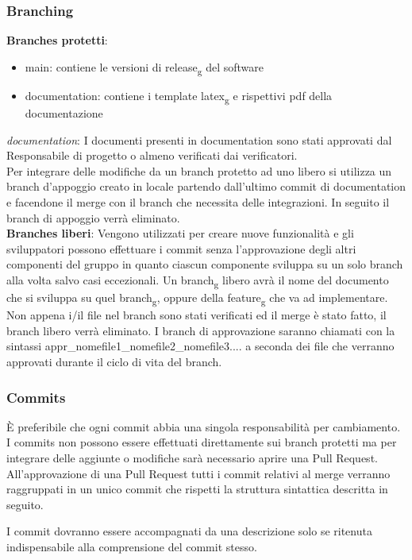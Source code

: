 \subsubsection{Branching}
\textbf{Branches protetti}:
    \begin{itemize} 
        \item main: contiene le versioni di release\textsubscript{g} del software
        \item documentation: contiene i template latex\textsubscript{g} e rispettivi pdf della documentazione
    \end{itemize}
\textit{documentation}: 
I documenti presenti in documentation sono stati approvati dal Responsabile di progetto o almeno verificati dai verificatori.\\
Per integrare delle modifiche da un branch protetto ad uno libero si utilizza un branch d’appoggio creato in locale partendo dall'ultimo commit di documentation e facendone il merge con il branch che necessita delle integrazioni. In seguito il branch di appoggio verrà eliminato.\\
\textbf{Branches liberi}:
Vengono utilizzati per creare nuove funzionalità e gli sviluppatori possono effettuare i commit senza l'approvazione degli altri componenti del gruppo
in quanto ciascun componente sviluppa su un solo branch alla volta salvo casi eccezionali.
Un branch\textsubscript{g} libero avrà il nome del documento che si sviluppa su quel branch\textsubscript{g}, oppure della feature\textsubscript{g} che va ad implementare.\\
Non appena i/il file nel branch sono stati verificati ed il merge è stato fatto, il branch libero verrà eliminato.
I branch di approvazione saranno chiamati con la sintassi appr\_nomefile1\_nomefile2\_nomefile3.... a seconda dei file che verranno approvati durante il ciclo di vita del branch.
\subsubsection{Commits}
È preferibile che ogni commit abbia una singola responsabilità per cambiamento.\\
I commits non possono essere effettuati direttamente sui branch protetti ma per integrare delle aggiunte o modifiche sarà necessario aprire una Pull Request.
All'approvazione di una Pull Request tutti i commit relativi al merge verranno raggruppati in un unico commit che rispetti la struttura sintattica descritta in seguito.

I commit dovranno essere accompagnati da una descrizione solo se ritenuta indispensabile alla comprensione del commit stesso.

